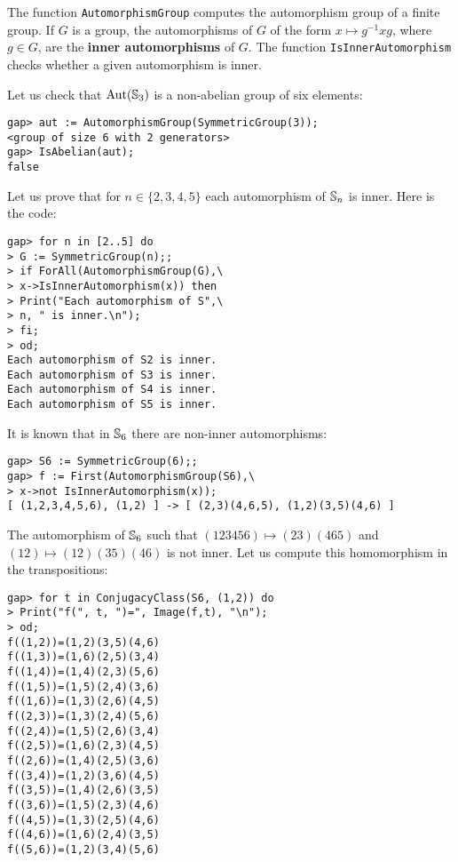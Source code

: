 The function \lstinline{AutomorphismGroup} computes the automorphism group of a
finite group. If $G$ is a group, the automorphisms of $G$ of the form $x\mapsto
g^{-1}xg$, where $g\in G$, are the \textbf{inner automorphisms} of $G$.  The
function \lstinline{IsInnerAutomorphism} checks whether a given automorphism is
inner. 

\begin{example}
Let us check that $\operatorname{Aut}(\mathbb{S}_3)$ is a non-abelian group of six elements:
\begin{lstlisting}
gap> aut := AutomorphismGroup(SymmetricGroup(3));
<group of size 6 with 2 generators>
gap> IsAbelian(aut);
false
\end{lstlisting}
\end{example}

\begin{example}
Let us prove that for $n\in\{2,3,4,5\}$ each automorphism of $\mathbb{S}_n$ is inner. Here is the code:
\begin{lstlisting}
gap> for n in [2..5] do
> G := SymmetricGroup(n);;
> if ForAll(AutomorphismGroup(G),\
> x->IsInnerAutomorphism(x)) then
> Print("Each automorphism of S",\
> n, " is inner.\n");
> fi;
> od;
Each automorphism of S2 is inner.
Each automorphism of S3 is inner.
Each automorphism of S4 is inner.
Each automorphism of S5 is inner.
\end{lstlisting}
It is known that in $\mathbb{S}_6$ there are non-inner automorphisms:
\begin{lstlisting}
gap> S6 := SymmetricGroup(6);;
gap> f := First(AutomorphismGroup(S6),\
> x->not IsInnerAutomorphism(x));
[ (1,2,3,4,5,6), (1,2) ] -> [ (2,3)(4,6,5), (1,2)(3,5)(4,6) ]
\end{lstlisting}
The automorphism of $\mathbb{S}_6$ such that 
$(123456)\mapsto (23)(465)$ and $(12)\mapsto(12)(35)(46)$
is not inner. 
Let us compute this homomorphism in the transpositions: 
\begin{lstlisting}
gap> for t in ConjugacyClass(S6, (1,2)) do
> Print("f(", t, ")=", Image(f,t), "\n"); 
> od;
f((1,2))=(1,2)(3,5)(4,6)
f((1,3))=(1,6)(2,5)(3,4)
f((1,4))=(1,4)(2,3)(5,6)
f((1,5))=(1,5)(2,4)(3,6)
f((1,6))=(1,3)(2,6)(4,5)
f((2,3))=(1,3)(2,4)(5,6)
f((2,4))=(1,5)(2,6)(3,4)
f((2,5))=(1,6)(2,3)(4,5)
f((2,6))=(1,4)(2,5)(3,6)
f((3,4))=(1,2)(3,6)(4,5)
f((3,5))=(1,4)(2,6)(3,5)
f((3,6))=(1,5)(2,3)(4,6)
f((4,5))=(1,3)(2,5)(4,6)
f((4,6))=(1,6)(2,4)(3,5)
f((5,6))=(1,2)(3,4)(5,6)
\end{lstlisting}
\end{example}

